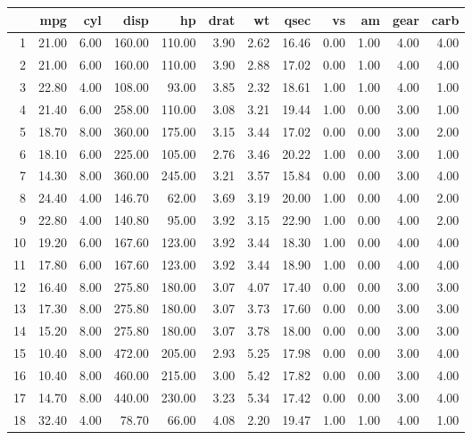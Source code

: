 \begin{table}[ht]
\centering
\begin{tabular}{rrrrrrrrrrrr}
  \hline
 & mpg & cyl & disp & hp & drat & wt & qsec & vs & am & gear & carb \\ 
  \hline
1 & 21.00 & 6.00 & 160.00 & 110.00 & 3.90 & 2.62 & 16.46 & 0.00 & 1.00 & 4.00 & 4.00 \\ 
  2 & 21.00 & 6.00 & 160.00 & 110.00 & 3.90 & 2.88 & 17.02 & 0.00 & 1.00 & 4.00 & 4.00 \\ 
  3 & 22.80 & 4.00 & 108.00 & 93.00 & 3.85 & 2.32 & 18.61 & 1.00 & 1.00 & 4.00 & 1.00 \\ 
  4 & 21.40 & 6.00 & 258.00 & 110.00 & 3.08 & 3.21 & 19.44 & 1.00 & 0.00 & 3.00 & 1.00 \\ 
  5 & 18.70 & 8.00 & 360.00 & 175.00 & 3.15 & 3.44 & 17.02 & 0.00 & 0.00 & 3.00 & 2.00 \\ 
  6 & 18.10 & 6.00 & 225.00 & 105.00 & 2.76 & 3.46 & 20.22 & 1.00 & 0.00 & 3.00 & 1.00 \\ 
  7 & 14.30 & 8.00 & 360.00 & 245.00 & 3.21 & 3.57 & 15.84 & 0.00 & 0.00 & 3.00 & 4.00 \\ 
  8 & 24.40 & 4.00 & 146.70 & 62.00 & 3.69 & 3.19 & 20.00 & 1.00 & 0.00 & 4.00 & 2.00 \\ 
  9 & 22.80 & 4.00 & 140.80 & 95.00 & 3.92 & 3.15 & 22.90 & 1.00 & 0.00 & 4.00 & 2.00 \\ 
  10 & 19.20 & 6.00 & 167.60 & 123.00 & 3.92 & 3.44 & 18.30 & 1.00 & 0.00 & 4.00 & 4.00 \\ 
  11 & 17.80 & 6.00 & 167.60 & 123.00 & 3.92 & 3.44 & 18.90 & 1.00 & 0.00 & 4.00 & 4.00 \\ 
  12 & 16.40 & 8.00 & 275.80 & 180.00 & 3.07 & 4.07 & 17.40 & 0.00 & 0.00 & 3.00 & 3.00 \\ 
  13 & 17.30 & 8.00 & 275.80 & 180.00 & 3.07 & 3.73 & 17.60 & 0.00 & 0.00 & 3.00 & 3.00 \\ 
  14 & 15.20 & 8.00 & 275.80 & 180.00 & 3.07 & 3.78 & 18.00 & 0.00 & 0.00 & 3.00 & 3.00 \\ 
  15 & 10.40 & 8.00 & 472.00 & 205.00 & 2.93 & 5.25 & 17.98 & 0.00 & 0.00 & 3.00 & 4.00 \\ 
  16 & 10.40 & 8.00 & 460.00 & 215.00 & 3.00 & 5.42 & 17.82 & 0.00 & 0.00 & 3.00 & 4.00 \\ 
  17 & 14.70 & 8.00 & 440.00 & 230.00 & 3.23 & 5.34 & 17.42 & 0.00 & 0.00 & 3.00 & 4.00 \\ 
  18 & 32.40 & 4.00 & 78.70 & 66.00 & 4.08 & 2.20 & 19.47 & 1.00 & 1.00 & 4.00 & 1.00 \\ 

\end{tabular}
\end{table}
